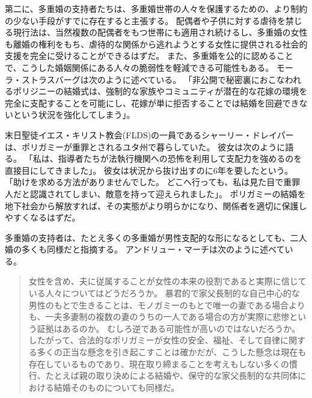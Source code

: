 \documentclass[paper=a4,book,openany]{jlreq}
\begin{document}
第二に、多重婚の支持者たちは、多重婚世帯の人々を保護するための、より制約の少ない手段がすでに存在すると主張する。
配偶者や子供に対する虐待を禁じる現行法は、当然複数の配偶者をもつ世帯にも適用され続けるし、多重婚の女性も離婚の権利をもち、虐待的な関係から逃れようとする女性に提供される社会的支援を完全に受けることができるはずだ。
また、多重婚を公的に認めることで、こうした婚姻関係にある人々の脆弱性を軽減できる可能性もある。
モーラ・ストラスバーグは次のように述べている。
「非公開で秘密裏におこなわれるポリジニーの結婚式は、強制的な家族やコミュニティが潜在的な花嫁の環境を完全に支配することを可能にし、花嫁が単に拒否することでは結婚を回避できないという状況を強化してしまう」\citep[p.369 fn.116.5]{strassberg02:_crime_polyg}。

末日聖徒イエス・キリスト教会(FLDS)の一員であるシャーリー・ドレイパーは、ポリガミーが重罪とされるユタ州で暮らしていた。
彼女は次のように語る。
「私は、指導者たちが法執行機関への恐怖を利用して支配力を強めるのを直接目にしてきました」。
彼女は状況から抜け出すのに6年を要したという。
「助けを求める方法がありませんでした。
どこへ行っても、私は見た目で重罪人だと認識されてしまい、敵意を持って迎えられました」\citep{smardon20:_polyg_is_decrim_utah}。
ポリガミーの結婚を地下社会から解放すれば、その実態がより明らかになり、関係者を適切に保護しやすくなるはずだ。

多重婚の支持者は、たとえ多くの多重婚が男性支配的な形になるとしても、二人婚の多くも同様だと指摘する。
アンドリュー・マーチは次のように述べている。

\begin{quote}
女性を含め、夫に従属することが女性の本来の役割であると実際に信じている人々についてはどうだろうか。
暴君的で家父長制的な自己中心的な男性のもとで生きることは、モノガミーのもとで唯一の妻である場合よりも、一夫多妻制の複数の妻のうちの一人である場合の方が実際に悲惨という証拠はあるのか。
むしろ逆である可能性が高いのではないだろうか。
したがって、合法的なポリガミーが女性の安全、福祉、そして自律に関する多くの正当な懸念を引き起こすことは確かだが、こうした懸念は現在も存在しているものであり、現在取り締まることを考えもしない多くの慣行、たとえば親の取り決めによる結婚や、保守的な家父長制的な共同体における結婚そのものについても同様だ。
\citep[p.260]{march11:_is_there_right_polyg}
\end{quote}
\end{document}
